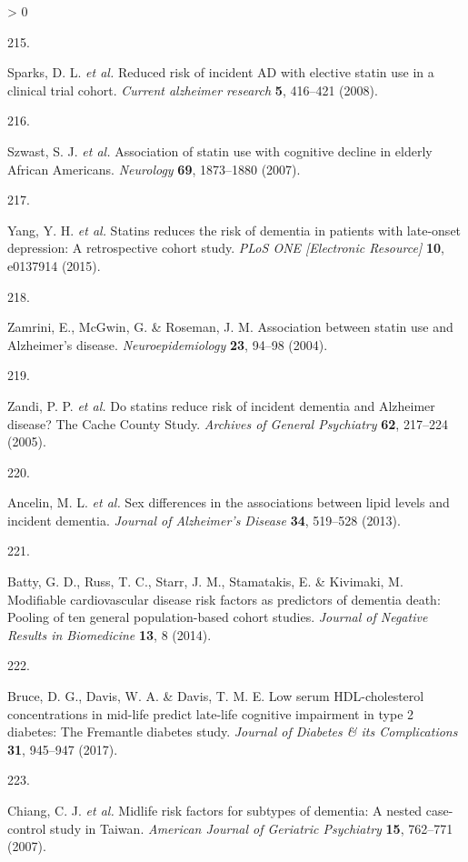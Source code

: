\documentclass[a4paper, twoside]{templates/ociamthesis}
\newlength{\cslhangindent}
\newlength{\csllabelwidth}
\newenvironment{CSLReferences}[3] %
 {%
  \setlength{\parindent}{0pt}
  \ifodd #1 \everypar{\setlength{\hangindent}{\cslhangindent}}\ignorespaces\fi
  \ifnum #2 > 0
  \setlength{\parskip}{#2\baselineskip}
  \fi
 }%
 {}
\newcommand{\CSLLeftMargin}[1]{\parbox[t]{\maxof{\widthof{#1}}{\csllabelwidth}}{#1}}
\newcommand{\CSLRightInline}[1]{\parbox[t]{\linewidth - \csllabelwidth}{#1}}
\begin{document}
\begin{CSLReferences}{0}{0}
\leavevmode\hypertarget{ref-sparks2008}{}%
\CSLLeftMargin{215. }
\CSLRightInline{Sparks, D. L. \emph{et al.} Reduced risk of incident {AD} with elective statin use in a clinical trial cohort. \emph{Current alzheimer research} \textbf{5}, 416--421 (2008).}

\leavevmode\hypertarget{ref-szwast2007}{}%
\CSLLeftMargin{216. }
\CSLRightInline{Szwast, S. J. \emph{et al.} Association of statin use with cognitive decline in elderly {African Americans}. \emph{Neurology} \textbf{69}, 1873--1880 (2007).}

\leavevmode\hypertarget{ref-yang2015}{}%
\CSLLeftMargin{217. }
\CSLRightInline{Yang, Y. H. \emph{et al.} Statins reduces the risk of dementia in patients with late-onset depression: A retrospective cohort study. \emph{PLoS ONE {[}Electronic Resource{]}} \textbf{10}, e0137914 (2015).}

\leavevmode\hypertarget{ref-zamrini2004}{}%
\CSLLeftMargin{218. }
\CSLRightInline{Zamrini, E., McGwin, G. \& Roseman, J. M. Association between statin use and {Alzheimer}'s disease. \emph{Neuroepidemiology} \textbf{23}, 94--98 (2004).}

\leavevmode\hypertarget{ref-zandi2005}{}%
\CSLLeftMargin{219. }
\CSLRightInline{Zandi, P. P. \emph{et al.} Do statins reduce risk of incident dementia and {Alzheimer} disease? The {Cache County Study}. \emph{Archives of General Psychiatry} \textbf{62}, 217--224 (2005).}

\leavevmode\hypertarget{ref-ancelin2013}{}%
\CSLLeftMargin{220. }
\CSLRightInline{Ancelin, M. L. \emph{et al.} Sex differences in the associations between lipid levels and incident dementia. \emph{Journal of Alzheimer's Disease} \textbf{34}, 519--528 (2013).}

\leavevmode\hypertarget{ref-batty2014}{}%
\CSLLeftMargin{221. }
\CSLRightInline{Batty, G. D., Russ, T. C., Starr, J. M., Stamatakis, E. \& Kivimaki, M. Modifiable cardiovascular disease risk factors as predictors of dementia death: Pooling of ten general population-based cohort studies. \emph{Journal of Negative Results in Biomedicine} \textbf{13}, 8 (2014).}

\leavevmode\hypertarget{ref-bruce2017}{}%
\CSLLeftMargin{222. }
\CSLRightInline{Bruce, D. G., Davis, W. A. \& Davis, T. M. E. Low serum {HDL}-cholesterol concentrations in mid-life predict late-life cognitive impairment in type 2 diabetes: The {Fremantle} diabetes study. \emph{Journal of Diabetes \& its Complications} \textbf{31}, 945--947 (2017).}

\leavevmode\hypertarget{ref-chiang2007}{}%
\CSLLeftMargin{223. }
\CSLRightInline{Chiang, C. J. \emph{et al.} Midlife risk factors for subtypes of dementia: A nested case-control study in {Taiwan}. \emph{American Journal of Geriatric Psychiatry} \textbf{15}, 762--771 (2007).}


\end{CSLReferences}
\end{document}
